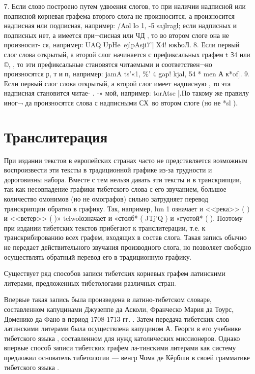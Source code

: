 {7.	Если слово построено путем удвоения слогов, то
при наличии надписной или подписной корневая графема второго слога не произносится, а произносится надписная или подписная, например:	/Aol lo 1,    -5 
sajlragl; если надписных и подписных нет, а имеется при¬писная   или ЧД , то во втором слоге она не произносит- ся, например:	UAQ UpHe\,	ejlpAsji7']
Х4!   юкЬоЛ.
8.	Если первый слог слова открытый, а второй слог
начинается с префиксальных графем t З4 или ©, , то эти префиксальные становятся читаемыми и соответствен¬но произносятся р, т и п, например:	jamA
ts'«1, \%' 4   gap! kjal,	54 *	men А к*of].
9.	Если первый слог слова открытый, а второй слог
имеет надписную , то эта надписная становится читае-
 . -»
мой, например:	torAtsc |.По такому же правилу иног¬
да произносятся слова с надписными СХ\ во втором слоге (но не *sl ).

\section{Транслитерация}

При издании текстов в европейских странах часто не представляется возможным воспроизвести эти тексты в традиционной графике из-за трудности и дороговизны набора. Вместе с тем нельзя давать эти тексты и в транскрипции, так как несовпадение графики тибетского слова с его звучанием, большое количество омонимов (но не омографов) сильно затрудняет перевод транскрипции обратно в графику. Так, например, lun 1 означает и <<река>> (	) и <<ветер>> (	)» telwolозначает и «столб* ( JTj'Q ) и «гуотой* (	). Поэтому при издании тибетских текстов прибегают к транслитерации, т.е. к транскрибированию всех графем, входящих в состав слога. Такая запись обычно не передает действительного звучания производного слога, но позволяет свободно осуществлять обратный перевод его в традиционную графику.

Существует ряд способов записи тибетских корневых графем латинскими литерами, предложенных тибетологами различных стран.

Впервые такая запись была произведена в латино-тибетском словаре, составленном капуцинами Джузеппе да Асколи, Франческо Мария да Тоурс, Доменико да Фано в период 1708-1713 гг. .
Затем передача тибетских слов латинскими литерами была осуществлена капуцином А. Георги в его учебнике тибетского языка   , составленном для нужд католических миссионеров.
Однако впервые способ записи тибетских графем ла-тинскими литерами как систему предложил основатель тибетологии — венгр Чома де Кёрбши в своей грамматике тибетского языка .

}
